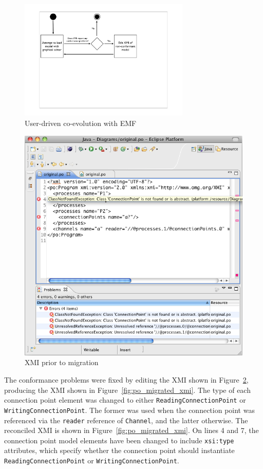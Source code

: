 \begin{figure}[htbp]
	\centering
		\includegraphics*[viewport=80 280 600 550,height=5.75cm]{6.Evaluation/images/user_driven/emf_process.pdf}
	\caption{User-driven co-evolution with EMF}
	\label{fig:emf_process}
\end{figure}

\begin{figure}[htbp]
	\centering
	\includegraphics[width=13.5cm]{6.Evaluation/images/user_driven/po_original_xmi.png}
	\caption{XMI prior to migration}
	\label{fig:po_original_xmi}
\end{figure}

The conformance problems were fixed by editing the XMI shown in Figure~\ref{fig:po_original_xmi}, producing the XMI shown in Figure~\ref{fig:po_migrated_xmi}. The type of each connection point element was changed to either \texttt{Re\-ad\-i\-ngCo\-nn\-ec\-ti\-o\-nPo\-i\-nt} or \texttt{Wr\-i\-ti\-ngCo\-nn\-ec\-ti\-o\-nPo\-i\-nt}. The former was used when the connection point was referenced via the \texttt{reader} reference of \texttt{Channel}, and the latter otherwise. The reconciled XMI is shown in Figure~\ref{fig:po_migrated_xmi}. On lines 4 and 7, the connection point model elements have been changed to include \texttt{xsi:type} attributes, which specify whether the connection point should instantiate \texttt{Re\-ad\-i\-ngCo\-nn\-ec\-ti\-o\-nPo\-i\-nt} or \texttt{Wr\-i\-ti\-ngCo\-nn\-ec\-ti\-o\-nPo\-i\-nt}.

